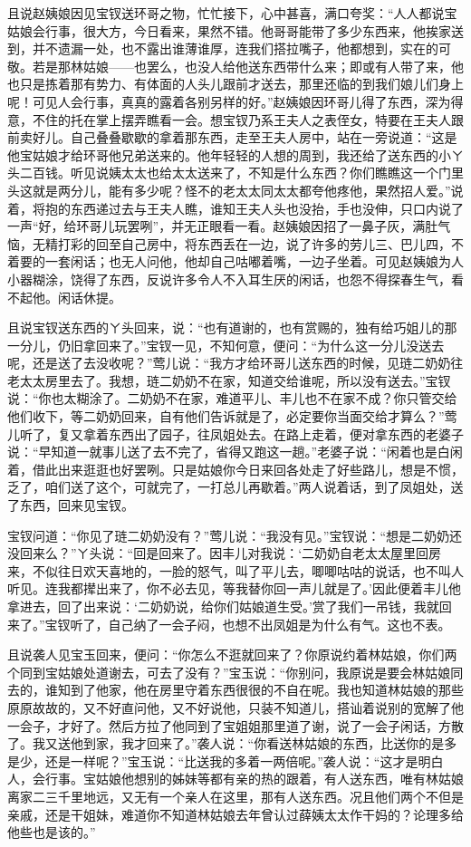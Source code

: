 且说赵姨娘因见宝钗送环哥之物，忙忙接下，心中甚喜，满口夸奖：“人人都说宝姑娘会行事，很大方，今日看来，果然不错。他哥哥能带了多少东西来，他挨家送到，并不遗漏一处，也不露出谁薄谁厚，连我们搭拉嘴子，他都想到，实在的可敬。若是那林姑娘------也罢么，也没人给他送东西带什么来；即或有人带了来，他也只是拣着那有势力、有体面的人头儿跟前才送去，那里还临的到我们娘儿们身上呢！可见人会行事，真真的露着各别另样的好。”赵姨娘因环哥儿得了东西，深为得意，不住的托在掌上摆弄瞧看一会。想宝钗乃系王夫人之表侄女，特要在王夫人跟前卖好儿。自己叠叠歇歇的拿着那东西，走至王夫人房中，站在一旁说道：“这是他宝姑娘才给环哥他兄弟送来的。他年轻轻的人想的周到，我还给了送东西的小ㄚ头二百钱。听见说姨太太也给太太送来了，不知是什么东西？你们瞧瞧这一个门里头这就是两分儿，能有多少呢？怪不的老太太同太太都夸他疼他，果然招人爱。”说着，将抱的东西递过去与王夫人瞧，谁知王夫人头也没抬，手也没伸，只口内说了一声“好，给环哥儿玩罢咧”，并无正眼看一看。赵姨娘因招了一鼻子灰，满肚气恼，无精打彩的回至自己房中，将东西丢在一边，说了许多的劳儿三、巴儿四，不着要的一套闲话；也无人问他，他却自己咕嘟着嘴，一边子坐着。可见赵姨娘为人小器糊涂，饶得了东西，反说许多令人不入耳生厌的闲话，也怨不得探春生气，看不起他。闲话休提。

且说宝钗送东西的ㄚ头回来，说：“也有道谢的，也有赏赐的，独有给巧姐儿的那一分儿，仍旧拿回来了。”宝钗一见，不知何意，便问：“为什么这一分儿没送去呢，还是送了去没收呢？”莺儿说：“我方才给环哥儿送东西的时候，见琏二奶奶往老太太房里去了。我想，琏二奶奶不在家，知道交给谁呢，所以没有送去。”宝钗说：“你也太糊涂了。二奶奶不在家，难道平儿、丰儿也不在家不成？你只管交给他们收下，等二奶奶回来，自有他们告诉就是了，必定要你当面交给才算么？”莺儿听了，复又拿着东西出了园子，往凤姐处去。在路上走着，便对拿东西的老婆子说：“早知道一就事儿送了去不完了，省得又跑这一趟。”老婆子说：“闲着也是白闲着，借此出来逛逛也好罢咧。只是姑娘你今日来回各处走了好些路儿，想是不惯，乏了，咱们送了这个，可就完了，一打总儿再歇着。”两人说着话，到了凤姐处，送了东西，回来见宝钗。

宝钗问道：“你见了琏二奶奶没有？”莺儿说：“我没有见。”宝钗说：“想是二奶奶还没回来么？”ㄚ头说：“回是回来了。因丰儿对我说：‘二奶奶自老太太屋里回房来，不似往日欢天喜地的，一脸的怒气，叫了平儿去，唧唧咕咕的说话，也不叫人听见。连我都撵出来了，你不必去见，等我替你回一声儿就是了。’因此便着丰儿他拿进去，回了出来说：‘二奶奶说，给你们姑娘道生受。’赏了我们一吊钱，我就回来了。”宝钗听了，自己纳了一会子闷，也想不出凤姐是为什么有气。这也不表。

且说袭人见宝玉回来，便问：“你怎么不逛就回来了？你原说约着林姑娘，你们两个同到宝姑娘处道谢去，可去了没有？”宝玉说：“你别问，我原说是要会林姑娘同去的，谁知到了他家，他在房里守着东西很很的不自在呢。我也知道林姑娘的那些原原故故的，又不好直问他，又不好说他，只装不知道儿，搭讪着说别的宽解了他一会子，才好了。然后方拉了他同到了宝姐姐那里道了谢，说了一会子闲话，方散了。我又送他到家，我才回来了。”袭人说：“你看送林姑娘的东西，比送你的是多是少，还是一样呢？”宝玉说：“比送我的多着一两倍呢。”袭人说：“这才是明白人，会行事。宝姑娘他想别的姊妹等都有亲的热的跟着，有人送东西，唯有林姑娘离家二三千里地远，又无有一个亲人在这里，那有人送东西。况且他们两个不但是亲戚，还是干姐妹，难道你不知道林姑娘去年曾认过薛姨太太作干妈的？论理多给他些也是该的。”

